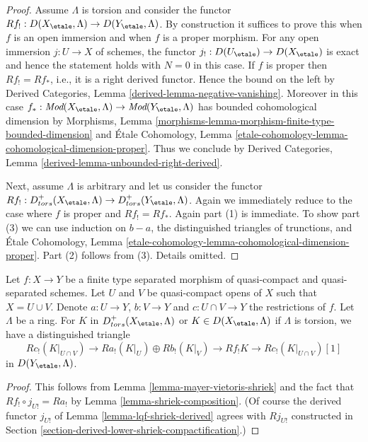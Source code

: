 \begin{proof}
Assume $\Lambda$ is torsion and consider the functor
$Rf_! : D(X_\etale, \Lambda) \to D(Y_\etale, \Lambda)$.
By construction it suffices to prove this when $f$ is an open immersion
and when $f$ is a proper morphism. For any open immersion $j : U \to X$
of schemes, the functor $j_! : D(U_\etale) \to D(X_\etale)$ is exact
and hence the statement holds with $N = 0$ in this case.
If $f$ is proper then $Rf_! = Rf_*$, i.e., it is a right derived
functor. Hence the bound on the left by
Derived Categories, Lemma \ref{derived-lemma-negative-vanishing}.
Moreover in this case $f_* : \textit{Mod}(X_\etale, \Lambda)
\to \textit{Mod}(Y_\etale, \Lambda)$ has bounded cohomological dimension by
Morphisms, Lemma \ref{morphisms-lemma-morphism-finite-type-bounded-dimension}
and \'Etale Cohomology, Lemma
\ref{etale-cohomology-lemma-cohomological-dimension-proper}.
Thus we conclude by
Derived Categories, Lemma \ref{derived-lemma-unbounded-right-derived}.

\medskip\noindent
Next, assume $\Lambda$ is arbitrary and let us consider the functor
$Rf_! : D^+_{tors}(X_\etale, \Lambda) \to D^+_{tors}(Y_\etale, \Lambda)$.
Again we immediately reduce to the case where $f$ is proper and
$Rf_! = Rf_*$. Again part (1) is immediate. To show part (3)
we can use induction on $b - a$, the distinguished
triangles of trunctions, and \'Etale Cohomology, Lemma
\ref{etale-cohomology-lemma-cohomological-dimension-proper}.
Part (2) follows from (3). Details omitted.
\end{proof}

\begin{lemma}
\label{lemma-relative-mayer-vietoris}
Let $f : X \to Y$ be a finite type separated morphism of quasi-compact and
quasi-separated schemes. Let $U$ and $V$ be quasi-compact opens of $X$
such that $X = U \cup V$. Denote $a : U \to Y$, $b : V \to Y$ and
$c : U \cap V \to Y$ the restrictions of $f$. Let $\Lambda$ be a ring.
For $K$ in $D^+_{tors}(X_\etale, \Lambda)$ or $K \in D(X_\etale, \Lambda)$
if $\Lambda$ is torsion, we have a distinguished triangle
$$
Rc_!(K|_{U \cap V}) \to
Ra_!(K|_U) \oplus Rb_!(K|_V) \to
Rf_!K \to 
Rc_!(K|_{U \cap V})[1]
$$
in $D(Y_\etale, \Lambda)$.
\end{lemma}

\begin{proof}
This follows from
Lemma \ref{lemma-mayer-vietoris-shriek}
and the fact that $Rf_! \circ j_{U!} = Ra_!$ by
Lemma \ref{lemma-shriek-composition}.
(Of course the derived functor $j_{U!}$ of
Lemma \ref{lemma-lqf-shriek-derived} agrees with
$Rj_{U!}$ constructed in
Section \ref{section-derived-lower-shriek-compactification}.)
\end{proof}

